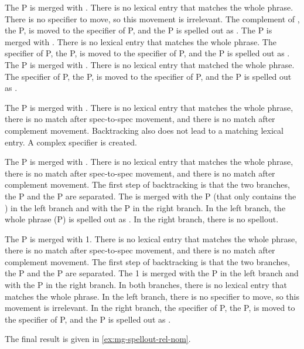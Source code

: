 The P is merged with . There is no lexical entry that matches the whole phrase. There is no specifier to move, so this movement is irrelevant. The complement of , the P, is moved to the specifier of P, and the P is spelled out as .
The P is merged with . There is no lexical entry that matches the whole phrase. The specifier of P, the P, is moved to the specifier of P, and the P is spelled out as .
The P is merged with . There is no lexical entry that matched the whole phrase. The specifier of P, the P, is moved to the specifier of P, and the P is spelled out as .

The P is merged with . There is no lexical entry that matches the whole phrase, there is no match after spec-to-spec movement, and there is no match after complement movement. Backtracking also does not lead to a matching lexical entry. A complex specifier is created.

The P is merged with . There is no lexical entry that matches the whole phrase, there is no match after spec-to-spec movement, and there is no match after complement movement. The first step of backtracking is that the two branches, the P and the P are separated. The  is merged with the P (that only contains the ) in the left branch and with the P in the right branch. In the left branch, the whole phrase (P) is spelled out as . In the right branch, there is no spellout.

The P is merged with 1. There is no lexical entry that matches the whole phrase, there is no match after spec-to-spec movement, and there is no match after complement movement. The first step of backtracking is that the two branches, the P and the P are separated. The 1 is merged with the P in the left branch and with the P in the right branch. In both branches, there is no lexical entry that matches the whole phrase. In the left branch, there is no specifier to move, so this movement is irrelevant. In the right branch, the specifier of P, the P, is moved to the specifier of P, and the P is spelled out as .

The final result is given in \ref{ex:mg-spellout-rel-nom}.

